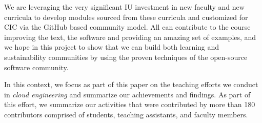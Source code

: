 \documentclass[conference]{IEEEtran}
\begin{document}
We are leveraging the very significant IU investment in new faculty and new curricula to develop modules sourced from these curricula and customized for CIC via the GitHub based community model. All can contribute to the course improving the text, the software and providing an amazing set of examples, and we hope in this project to show that we can build both learning and sustainability communities by using the proven techniques of the open-source software community.

In this context, we focus as part of this paper on the teaching efforts we conduct in {\em cloud engineering} and summarize our achievements and findings. As part of this effort, we summarize our activities that were contributed by more than 180 contributors comprised of students, teaching assistants, and faculty members.
\end{document}
